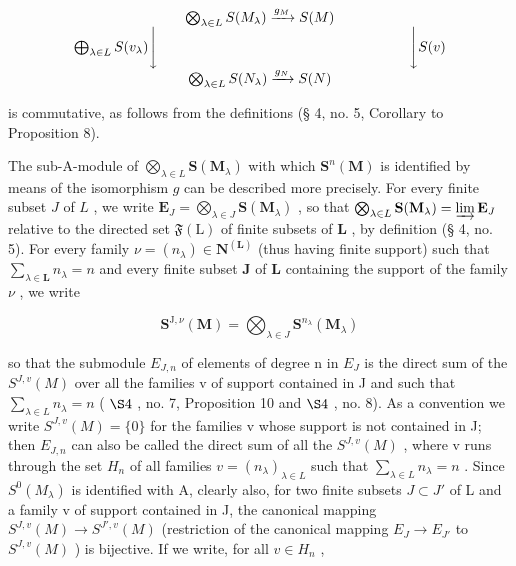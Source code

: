 \[
\begin{array}{c} \bigotimes_ {\lambda \in L} S (M _ {\lambda}) \xrightarrow {g _ {M}} S (M) \\ \bigoplus_ {\lambda \in L} S (v _ {\lambda}) \Biggl \downarrow \qquad \qquad \qquad \qquad \qquad \qquad \qquad \qquad \qquad \Biggl \downarrow S (v) \\ \bigotimes_ {\lambda \in L} S (N _ {\lambda}) \xrightarrow {g _ {N}} S (N) \end{array}
\]

is commutative, as follows from the definitions (§ 4, no. 5, Corollary to Proposition 8).

The sub-A-module of \(\bigotimes_{\lambda \in L} \mathbf{S}(\mathbf{M}_{\lambda})\) with which \(\mathbf{S}^n(\mathbf{M})\) is identified by means of the isomorphism \(g\) can be described more precisely. For every finite subset \(J\) of \(L\) , we write \(\mathbf{E}_J = \bigotimes_{\lambda \in J} \mathbf{S}(\mathbf{M}_{\lambda})\) , so that \(\bigotimes_{\lambda \in L} \mathbf{S}(\mathbf{M}_{\lambda}) = \varinjlim \mathbf{E}_J\) relative to the directed set \(\mathfrak{F}(\mathrm{L})\) of finite subsets of \(\mathbf{L}\) , by definition (§ 4, no. 5). For every family \(\nu = (n_{\lambda}) \in \mathbf{N}^{(\mathbf{L})}\) (thus having finite support) such that \(\sum_{\lambda \in \mathbf{L}} n_{\lambda} = n\) and every finite subset \(\mathbf{J}\) of \(\mathbf{L}\) containing the support of the family \(\nu\) , we write

\[
\mathbf {S} ^ {\mathrm{J}, \nu} (\mathbf {M}) = \bigotimes_ {\lambda \in J} \mathbf {S} ^ {n _ {\lambda}} (\mathbf {M} _ {\lambda})\tag{12}
\]

so that the submodule \(E_{J,n}\) of elements of degree n in \(E_{J}\) is the direct sum of the \(S^{J,v}(M)\) over all the families v of support contained in J and such that \(\sum_{\lambda\in L}n_{\lambda}=n\) ( \(\S4\) , no. 7, Proposition 10 and \(\S4\) , no. 8). As a convention we write \(S^{J,v}(M)=\{0\}\) for the families v whose support is not contained in J; then \(E_{J,n}\) can also be called the direct sum of all the \(S^{J,v}(M)\) , where v runs through the set \(H_{n}\) of all families \(v=(n_{\lambda})_{\lambda\in L}\) such that \(\sum_{\lambda\in L}n_{\lambda}=n\) . Since \(S^{0}(M_{\lambda})\) is identified with A, clearly also, for two finite subsets \(J\subset J'\) of L and a family v of support contained in J, the canonical mapping \(S^{J,v}(M)\to S^{J',v}(M)\) (restriction of the canonical mapping \(E_{J}\to E_{J'}\) to \(S^{J,v}(M)\) ) is bijective. If we write, for all \(v\in H_{n}\) ,

